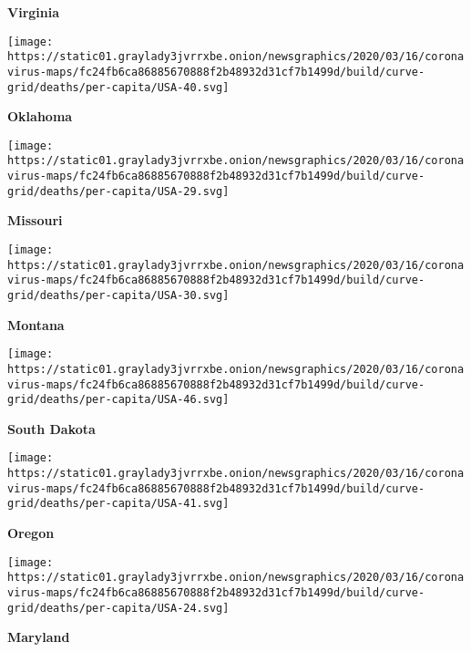 \textbf{Virginia}

\href{https://www.nytimes3xbfgragh.onion/interactive/2020/us/oklahoma-coronavirus-cases.html}{}

\texttt{[image: https://static01.graylady3jvrrxbe.onion/newsgraphics/2020/03/16/coronavirus-maps/fc24fb6ca86885670888f2b48932d31cf7b1499d/build/curve-grid/deaths/per-capita/USA-40.svg]}

\textbf{Oklahoma}

\href{https://www.nytimes3xbfgragh.onion/interactive/2020/us/missouri-coronavirus-cases.html}{}

\texttt{[image: https://static01.graylady3jvrrxbe.onion/newsgraphics/2020/03/16/coronavirus-maps/fc24fb6ca86885670888f2b48932d31cf7b1499d/build/curve-grid/deaths/per-capita/USA-29.svg]}

\textbf{Missouri}

\href{https://www.nytimes3xbfgragh.onion/interactive/2020/us/montana-coronavirus-cases.html}{}

\texttt{[image: https://static01.graylady3jvrrxbe.onion/newsgraphics/2020/03/16/coronavirus-maps/fc24fb6ca86885670888f2b48932d31cf7b1499d/build/curve-grid/deaths/per-capita/USA-30.svg]}

\textbf{Montana}

\href{https://www.nytimes3xbfgragh.onion/interactive/2020/us/south-dakota-coronavirus-cases.html}{}

\texttt{[image: https://static01.graylady3jvrrxbe.onion/newsgraphics/2020/03/16/coronavirus-maps/fc24fb6ca86885670888f2b48932d31cf7b1499d/build/curve-grid/deaths/per-capita/USA-46.svg]}

\textbf{South Dakota}

\href{https://www.nytimes3xbfgragh.onion/interactive/2020/us/oregon-coronavirus-cases.html}{}

\texttt{[image: https://static01.graylady3jvrrxbe.onion/newsgraphics/2020/03/16/coronavirus-maps/fc24fb6ca86885670888f2b48932d31cf7b1499d/build/curve-grid/deaths/per-capita/USA-41.svg]}

\textbf{Oregon}

\href{https://www.nytimes3xbfgragh.onion/interactive/2020/us/maryland-coronavirus-cases.html}{}

\texttt{[image: https://static01.graylady3jvrrxbe.onion/newsgraphics/2020/03/16/coronavirus-maps/fc24fb6ca86885670888f2b48932d31cf7b1499d/build/curve-grid/deaths/per-capita/USA-24.svg]}

\textbf{Maryland}

\href{https://www.nytimes3xbfgragh.onion/interactive/2020/us/indiana-coronavirus-cases.html}{}

